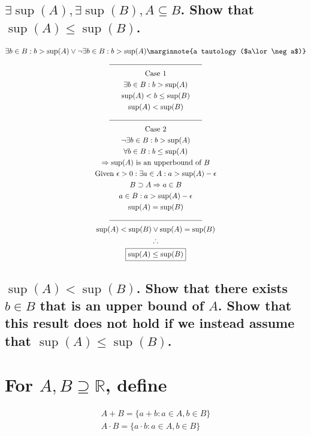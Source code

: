 \documentclass[letterpaper]{article}
\begin{document}
\subsection{$\exists\sup(A),\exists\sup(B),A\subseteq B$. Show that $\sup(A)\leq\sup(B)$.}
\begin{gather*}
	\exists b\in B: b > \sup(A) \lor \neg \exists b\in B: b > \sup(A) \marginnote{a tautology ($a\lor\neg a$)} \\
	\line(1, 0){125} \\
	\text{Case 1} \\
	\exists b\in B: b > \sup(A) \\
	\sup(A) < b \leq \sup(B) \\
	\sup(A) < \sup(B) \\
	\line(1, 0){125} \\
	\text{Case 2} \\
	\neg \exists b\in B: b > \sup(A) \\
	\forall b\in B:b\leq\sup(A) \\
	\Rightarrow \text{$\sup(A)$ is an upperbound of $B$} \\
	\text{Given }\epsilon>0: \exists a \in A: a>\sup(A)-\epsilon \\
	B\supset A \Rightarrow a\in B \\
	a \in B: a>\sup(A)-\epsilon \\
	\sup(A) = \sup(B) \\
	\line(1, 0){125} \\
	\sup(A) < \sup(B) \lor \sup(A) = \sup(B) \\
	\therefore \\
	\boxed{\sup(A)\leq\sup(B)}
\end{gather*}
\subsection{$\sup(A)<\sup(B)$. Show that there exists $b\in B$ that is an upper bound of $A$. Show that this result does not hold if we instead assume that $\sup(A)\leq\sup(B)$.}

\section{For $A,B\supseteq \mathbb{R}$, define}
\begin{gather*}
A+B=\{a+b:a\in A,b\in B\} \\
A\cdot B=\{a\cdot b:a\in A,b\in B\}
\end{gather*}
\end{document}

